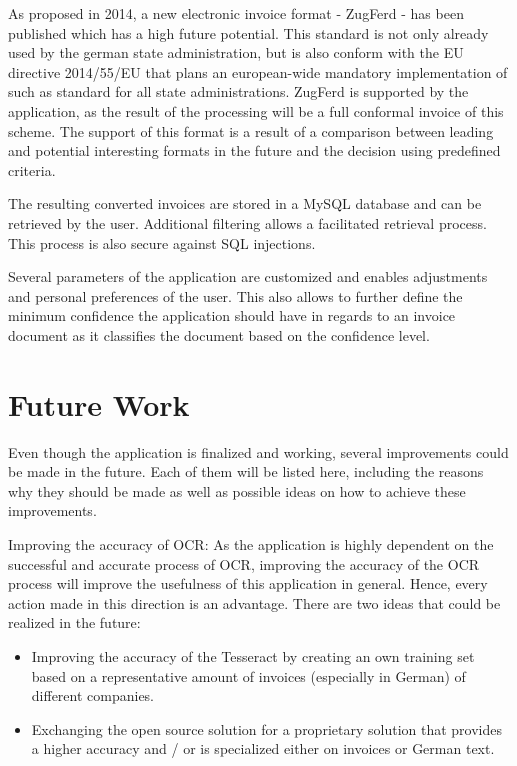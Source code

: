 As proposed in 2014, a new electronic invoice format - ZugFerd - has been published which has a high future potential\cite{Ferd14}. This standard is not only already used by the german state administration, but is also conform with the EU directive 2014/55/EU that plans an european-wide mandatory implementation of such as standard for all state administrations. 
ZugFerd is supported by the application, as the result of the processing will be a full conformal invoice of this scheme. The support of this format is a result of a comparison between leading and potential interesting formats in the future and the decision using predefined criteria.

The resulting converted invoices are stored in a MySQL database and can be retrieved by the user. Additional filtering allows a facilitated retrieval process. This process is also secure against SQL injections.

Several parameters of the application are customized and enables adjustments and personal preferences of the user. This also allows to further define the minimum confidence the application should have in regards to an invoice document as it classifies the document based on the confidence level. 

\section{Future Work}
\label{sec6.3}
Even though the application is finalized and working, several improvements could be made in the future.
Each of them will be listed here, including the reasons why they should be made as well as possible ideas on how to achieve these improvements.

Improving the accuracy of OCR: As the application is highly dependent on the successful and accurate process of OCR, improving the accuracy of the OCR process will improve the usefulness of this application in general. Hence, every action made in this direction is an advantage. There are two ideas that could be realized in the future: 
	\begin{itemize}
		\item Improving the accuracy of the Tesseract by creating an own training set based on a representative amount of invoices (especially in German) of different companies. 
		\item Exchanging the open source solution for a proprietary solution that provides a higher accuracy and / or is specialized either on invoices or German text.
	\end{itemize}

